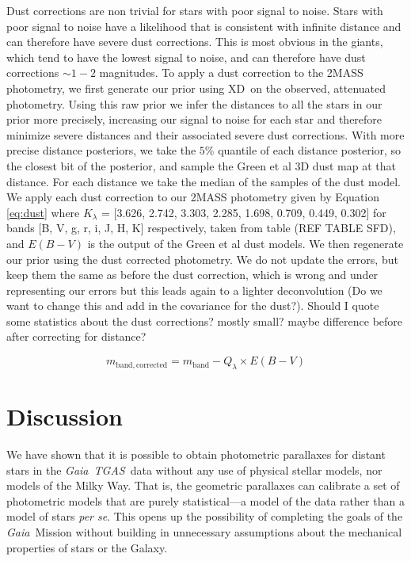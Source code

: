 \documentclass[modern]{aastex61}
\newcommand{\foreign}[1]{\textsl{#1}}
\newcommand{\acronym}[1]{{\small{#1}}}
\newcommand{\project}[1]{\textsl{#1}}
\newcommand{\tgas}{\project{\acronym{TGAS}}}
\newcommand{\gaia}{\project{Gaia}}
\newcommand{\xd}{\acronym{XD}}
\begin{document}
Dust corrections are non trivial for stars with poor signal to noise. Stars with poor signal to noise have a likelihood that is consistent with infinite distance and can therefore have severe dust corrections. This is most obvious in the giants, which tend to have the lowest signal to noise, and can therefore have dust corrections $\sim 1-2$ magnitudes. To apply a dust correction to the 2MASS photometry, we first generate our prior using \xd\ on the observed, attenuated photometry. Using this raw prior we infer the distances to all the stars in our prior more precisely, increasing our signal to noise for each star and therefore minimize severe distances and their associated severe dust corrections. With more precise distance posteriors, we take the $5\%$ quantile of each distance posterior, so the closest bit of the posterior, and sample the Green et al 3D dust map at that distance. For each distance we take the median of the samples of the dust model. We apply each dust correction to our 2MASS photometry given by Equation \ref{eq:dust} where $K_{\lambda}$ = [3.626, 2.742, 3.303, 2.285, 1.698, 0.709, 0.449, 0.302] for bands [B, V, g, r, i, J, H, K] respectively, taken from table (REF TABLE SFD), and $E(B-V)$ is the output of the Green et al dust models. We then regenerate our prior using the dust corrected photometry. We do not update the errors, but keep them the same as before the dust correction, which is wrong and under representing our errors but this leads again to a lighter deconvolution (Do we want to change this and add in the covariance for the dust?). Should I quote some statistics about the dust corrections? mostly small? maybe difference before after correcting for distance?

\begin{equation}
\label{eq:dust}
m_{\mathrm{band, corrected}} = m_{\mathrm{band}} - Q_{\lambda} \times E(B-V)
\end{equation}

\section{Discussion}

We have shown that it is possible to obtain photometric parallaxes for
distant stars in the \gaia\ \tgas\ data without any use of physical stellar
models, nor models of the Milky Way.
That is, the geometric parallaxes can calibrate a set of photometric
models that are purely statistical---a model of the data rather than
a model of stars \foreign{per se}.
This opens up the possibility of completing the goals of the \gaia\ Mission
without building in unnecessary assumptions about the mechanical properties
of stars or the Galaxy.
\end{document}
